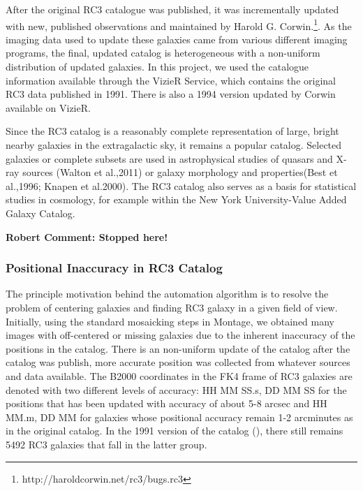 \documentclass[authoryear, 12pt,5p, times]{elsarticle}
\begin{document}
After the original RC3 catalogue was published, it was incrementally updated with new, published observations and maintained by Harold G. Corwin.\footnote{http://haroldcorwin.net/rc3/bugs.rc3}. As the imaging data used to update these galaxies  came from various different imaging programs, the final, updated catalog is heterogeneous with a non-uniform distribution of updated galaxies. In this project, we used the catalogue information available through the VizieR Service,  which contains the original  RC3 data published in 1991. There is also a 1994 version updated by Corwin available on VizieR. 

Since the RC3 catalog  is a reasonably complete representation of large, bright nearby galaxies in the extragalactic sky, it remains a popular catalog. Selected galaxies or complete subsets are used in astrophysical studies of quasars and X-ray sources (Walton et al.,2011) or galaxy morphology and properties(Best et al.,1996; Knapen et al.2000).  The RC3 catalog also serves as a basis for statistical studies  in cosmology, for example within the New York University-Value Added Galaxy Catalog\citep{nyuvagc}.

\textbf{Robert Comment: Stopped here!}

\subsubsection{Positional Inaccuracy in RC3 Catalog\label{sec:position}}

The principle motivation behind the automation algorithm is to resolve the problem of centering galaxies and finding RC3 galaxy in a given field of view. Initially, using the standard mosaicking steps in Montage, we obtained many images with  off-centered or missing galaxies due to the inherent inaccuracy of the positions in the catalog. There is an non-uniform update of the catalog after the catalog was publish, more accurate position was collected from whatever sources and data available. The B2000 coordinates in the FK4 frame of  RC3 galaxies are denoted with two different levels of accuracy: HH MM SS.s, DD MM SS for the positions that has been updated  with accuracy of about 5-8 arcsec and  HH MM.m, DD MM for galaxies whose positional accuracy remain  1-2 arcminutes as in the original catalog.  In the 1991 version of the catalog (\citealp{rc31991}), there still remains 5492 RC3 galaxies that fall in the latter group.
\end{document}
